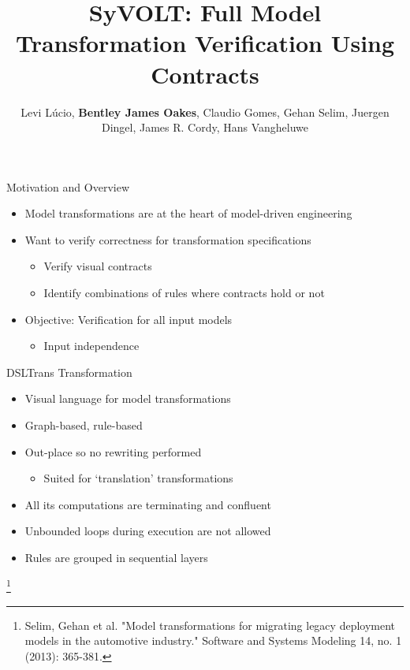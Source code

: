 \documentclass[xcolor=dvipsnames, 12pt, handout]{beamer}
\title[SyVOLT]{SyVOLT: Full Model Transformation Verification Using Contracts}
\author[Lucio et al.]{Levi L\'{u}cio, \textbf{Bentley James Oakes}, Claudio Gomes, Gehan Selim, Juergen Dingel, James R. Cordy, Hans Vangheluwe}
\institute[]{McGill University, Canada\\University of Antwerp, Belgium\\Queen's University, Canada}
\newcommand\blfootnote[1]{%
  \begingroup
  \renewcommand\thefootnote{}\footnote{#1}%
  \addtocounter{footnote}{-1}%
  \endgroup
}
\begin{document}
\maketitle


\begin{frame}{Motivation and Overview}
\begin{itemize}[<+->]
\item Model transformations are at the heart of model-driven engineering
\item Want to verify correctness for transformation specifications
\begin{itemize}[<+->]
\item Verify visual contracts
\item Identify combinations of rules where contracts hold or not
\end{itemize}
\item Objective: Verification for all input models
\begin{itemize}
\item Input independence
\end{itemize}
\end{itemize}
\end{frame}






\begin{frame}{DSLTrans Transformation}

\begin{itemize}[<+->]
\item Visual language for model transformations

\item Graph-based, rule-based
\item Out-place so no rewriting performed
\begin{itemize}
\item Suited for `translation' transformations
\end{itemize}
\item All its computations are terminating and confluent
\item Unbounded loops during execution are not allowed

\item Rules are grouped in sequential layers
\end{itemize}

\blfootnote{Selim, Gehan et al. "Model transformations for migrating legacy deployment models in the automotive industry." Software and Systems Modeling 14, no. 1 (2013): 365-381.}

\end{frame}
\end{document}
